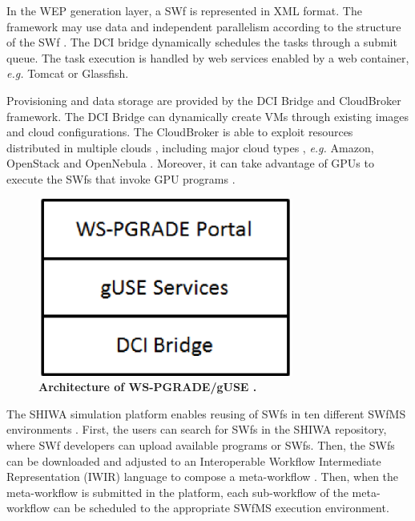 In the WEP generation layer, a SWf is represented in
XML format. The framework may use data and independent
parallelism according to the structure of the
SWf \cite{Balasko2014}. The DCI
bridge dynamically schedules the tasks through a submit queue. The
task execution is handled by web services enabled by a web container,
\textit{e.g.} Tomcat or Glassfish.


Provisioning and data storage are provided by the
DCI Bridge \cite{Kacsuk2014}
and CloudBroker framework.
The DCI Bridge can dynamically create VMs through existing images
and cloud configurations.  The CloudBroker is able to
exploit resources distributed in multiple clouds
\cite{Farkas2014}, including major cloud types , \textit{e.g.} Amazon,
OpenStack \cite{Jackson2012} and OpenNebula
\cite{Milojicic2011}. Moreover, it can take advantage of GPUs to
execute the SWfs that invoke GPU programs \cite{Balasko2014}.


\begin{figure}
\begin{centering}
\captionsetup{justification=centering}
\includegraphics[width=84mm]{figures/f18}
\par\end{centering}

\caption{\textbf{Architecture of WS-PGRADE/gUSE \cite{Gottdank2014}. }}
\label{fig:f18} 
\end{figure} 

The SHIWA simulation platform enables reusing of SWfs in ten
different SWfMS environments \cite{Tersty2014}. First, the users can
search for SWfs in the SHIWA
repository, where SWf developers can upload available programs or
SWfs. Then, the SWfs can be downloaded and adjusted to an Interoperable Workflow Intermediate
Representation (IWIR) language to compose a meta-workflow
\cite{Plankensteiner2013}. Then, when the meta-workflow is
submitted in the platform, each sub-workflow of the
meta-workflow can be scheduled to the appropriate  SWfMS execution environment.


